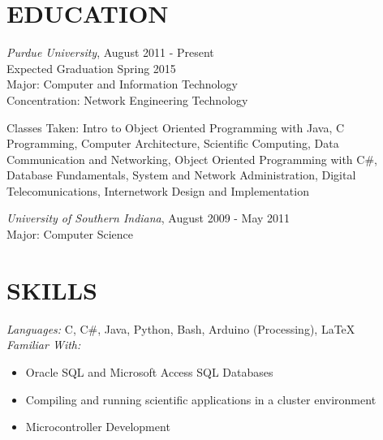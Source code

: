 \documentclass[line,margin]{res}
\begin{document}
\name{\textcolor{TealBlue}{Ethan Madden}}
\address{maddene@purdue.edu}
\address{(812) 250-1419}
 
\begin{resume}
\section{\textcolor{TealBlue}{EDUCATION}} 

				{\sl Purdue University}, \hfill August 2011 - Present \\
                Expected Graduation Spring 2015 \\
                Major: Computer and Information Technology \\
                Concentration: Network Engineering Technology
                
                Classes Taken: Intro to Object Oriented Programming with Java, C Programming, Computer Architecture, Scientific Computing, Data Communication and Networking, Object Oriented Programming with C\#, Database Fundamentals, System and Network Administration, Digital Telecomunications, Internetwork Design and Implementation

        {\sl University of Southern Indiana}, \hfill August 2009 - May 2011 \\
                Major: Computer Science
                
 
\section{\textcolor{TealBlue}{SKILLS}} 
				{\sl Languages:}  C, C\#, Java, Python, Bash, Arduino (Processing), \LaTeX \\
				{\sl Familiar With:} 
                \begin{itemize} \itemsep -2pt %
                  \item Oracle SQL and Microsoft Access SQL Databases
                  \item Compiling and running scientific applications in a cluster environment
                  \item Microcontroller Development
                \end{itemize}
 

\end{resume}
\end{document}
